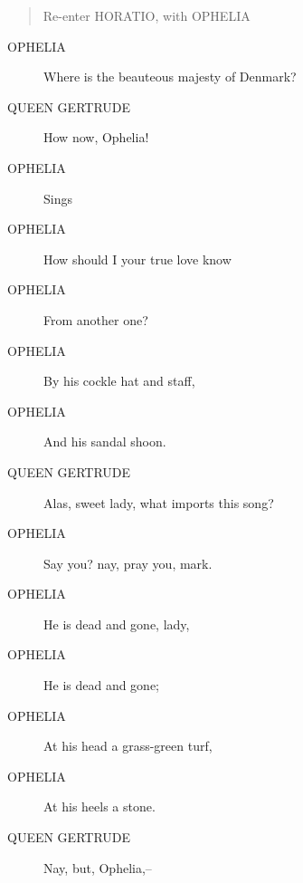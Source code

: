 \documentclass{article}
\begin{document}
\begin{quote}
Re-enter HORATIO, with OPHELIA
\end{quote}
          
\begin{description}
            
\item[OPHELIA] Where is the beauteous majesty of Denmark?
\end{description}
          
\begin{description}
            
\item[QUEEN GERTRUDE] How now, Ophelia!
\end{description}
          
\begin{description}
            
\item[OPHELIA] 
               Sings
            
\item[OPHELIA] How should I your true love know
\item[OPHELIA] From another one?
\item[OPHELIA] By his cockle hat and staff,
\item[OPHELIA] And his sandal shoon.
\end{description}
          
\begin{description}
            
\item[QUEEN GERTRUDE] Alas, sweet lady, what imports this song?
\end{description}
          
\begin{description}
            
\item[OPHELIA] Say you? nay, pray you, mark.
\item[OPHELIA] He is dead and gone, lady,
\item[OPHELIA] He is dead and gone;
\item[OPHELIA] At his head a grass-green turf,
\item[OPHELIA] At his heels a stone.
\end{description}
          
\begin{description}
            
\item[QUEEN GERTRUDE] Nay, but, Ophelia,--
\end{description}
          
\end{document}
